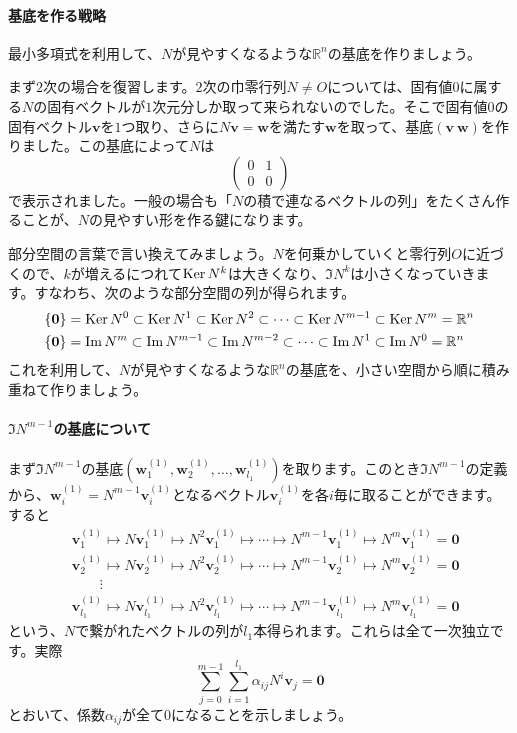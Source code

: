 \paragraph{基底を作る戦略}

最小多項式を利用して、$N$が見やすくなるような$\mathbb{R}^n$の基底を作りましょう。

まず$2$次の場合を復習します。$2$次の巾零行列$N \neq O$については、固有値$0$に属する$N$の固有ベクトルが$1$次元分しか取って来られないのでした。そこで固有値$0$の固有ベクトル$\bm{v}$を$1$つ取り、さらに$N\bm{v} = \bm{w}$を満たす$\bm{w}$を取って、基底$(\bm{v} \ \bm{w})$を作りました。この基底によって$N$は
\[
\begin{pmatrix}
0 & 1 \\
0 & 0
\end{pmatrix}
\]
で表示されました。一般の場合も「$N$の積で連なるベクトルの列」をたくさん作ることが、$N$の見やすい形を作る鍵になります。

部分空間の言葉で言い換えてみましょう。$N$を何乗かしていくと零行列$O$に近づくので、$k$が増えるにつれて$\operatorname{Ker} N^k$は大きくなり、$\Im N^k$は小さくなっていきます。すなわち、次のような部分空間の列が得られます。
\begin{align*}
& \{\boldsymbol{0}\} = \operatorname{Ker} N^0 \subset \operatorname{Ker} N^1 \subset \operatorname{Ker} N^2 \subset \cdots \subset \operatorname{Ker} N^{m - 1} \subset \operatorname{Ker} N^m = \mathbb{R}^n \\
& \{\boldsymbol{0}\} = \mathrm{Im}\, N^m \subset \mathrm{Im}\, N^{m - 1} \subset \mathrm{Im}\, N^{m - 2} \subset \cdots \subset \mathrm{Im}\, N^1 \subset \mathrm{Im}\, N^0 = \mathbb{R}^n
\end{align*}
これを利用して、$N$が見やすくなるような$\mathbb{R}^n$の基底を、小さい空間から順に積み重ねて作りましょう。

\paragraph{$\Im N^{m - 1}$の基底について}

まず$\Im N^{m - 1}$の基底$(\bm{w}^{(1)}_1, \bm{w}^{(1)}_2, \ldots, \bm{w}^{(1)}_{l_1})$を取ります。このとき$\Im N^{m - 1}$の定義から、$\bm{w}^{(1)}_i = N^{m - 1} \bm{v}^{(1)}_i$となるベクトル$\bm{v}^{(1)}_i$を各$i$毎に取ることができます。すると
\begin{align*}
&\bm{v}^{(1)}_1 \mapsto N \bm{v}^{(1)}_1 \mapsto N^2 \bm{v}^{(1)}_1 \mapsto \cdots \mapsto N^{m - 1} \bm{v}^{(1)}_1 \mapsto N^m \bm{v}^{(1)}_1 = \bm{0} \\
&\bm{v}^{(1)}_2 \mapsto N \bm{v}^{(1)}_2 \mapsto N^2 \bm{v}^{(1)}_2 \mapsto \cdots \mapsto N^{m - 1} \bm{v}^{(1)}_2 \mapsto N^m \bm{v}^{(1)}_2 = \bm{0} \\
&\qquad \vdots \\
&\bm{v}^{(1)}_{l_1} \mapsto N \bm{v}^{(1)}_{l_1} \mapsto N^2 \bm{v}^{(1)}_{l_1} \mapsto \cdots \mapsto N^{m - 1} \bm{v}^{(1)}_{l_1} \mapsto N^m \bm{v}^{(1)}_{l_1} = \bm{0}
\end{align*}
という、$N$で繋がれたベクトルの列が$l_1$本得られます。これらは全て一次独立です。実際
\[
\sum_{j = 0}^{m - 1} \sum_{i = 1}^{l_1} \alpha_{ij} N^i \bm{v}_j = \bm{0}
\]
とおいて、係数$\alpha_{ij}$が全て$0$になることを示しましょう。

